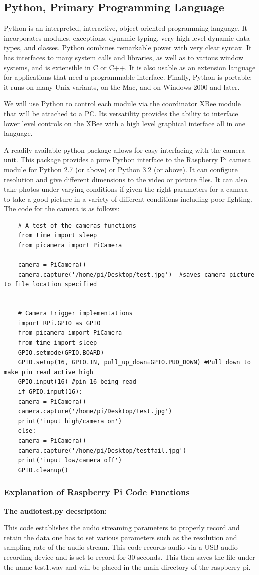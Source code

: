 	\subsection{Python, Primary Programming Language}
	\par Python is an interpreted, interactive, object-oriented programming language. It incorporates modules, exceptions, dynamic typing, very high-level dynamic data types, and classes. Python combines remarkable power with very clear syntax. It has interfaces to many system calls and libraries, as well as to various window systems, and is extensible in C or C++. It is also usable as an extension language for applications that need a programmable interface. Finally, Python is portable: it runs on many Unix variants, on the Mac, and on Windows 2000 and later.
	\par We will use Python to control each module via the coordinator XBee module that will be attached to a PC. Its versatility provides the ability to interface lower level controls on the XBee with a high level graphical interface all in one language. 
	\par A readily available python package allows for easy interfacing with the camera unit. This package provides a pure Python interface to the Raspberry Pi camera module for Python 2.7 (or above) or Python 3.2 (or above). It can configure resolution and give different dimensions to the video or picture files. It can also take photos under varying conditions if given the right parameters for a camera to take a good picture in a variety of different conditions including poor lighting. 
	The code for the camera is as follows:
	\begin{lstlisting}
	# A test of the cameras functions
	from time import sleep
	from picamera import PiCamera
	
	camera = PiCamera()
	camera.capture('/home/pi/Desktop/test.jpg')  #saves camera picture to file location specified
	
	
	# Camera trigger implementations
	import RPi.GPIO as GPIO
	from picamera import PiCamera
	from time import sleep
	GPIO.setmode(GPIO.BOARD)
	GPIO.setup(16, GPIO.IN, pull_up_down=GPIO.PUD_DOWN) #Pull down to make pin read active high
	GPIO.input(16) #pin 16 being read
	if GPIO.input(16):
	camera = PiCamera()
	camera.capture('/home/pi/Desktop/test.jpg')
	print('input high/camera on')
	else:
	camera = PiCamera()
	camera.capture('/home/pi/Desktop/testfail.jpg')
	print('input low/camera off')
	GPIO.cleanup()
	\end{lstlisting}
	\subsubsection{Explanation of Raspberry Pi Code Functions}
		\noindent\textbf{The audiotest.py decsription: }
		\par This code establishes the audio streaming parameters to properly record and retain the data one has to set various parameters such as the resolution and sampling rate of the audio stream. This code records audio via a USB audio recording device and is set to record for 30 seconds. This then saves the file under the name test1.wav and will be placed in the main directory of the raspberry pi. \\
		
